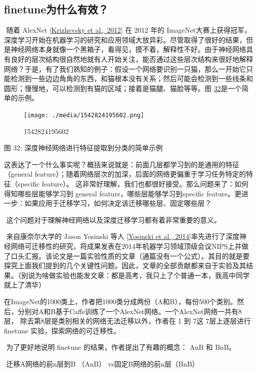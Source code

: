 \subsection{finetune为什么有效？}\label{finetuneux4e3aux4ec0ux4e48ux6709ux6548}

​ 随着 AlexNet {[}\protect\hyperlink{bookmark268}{Krizhevsky et al.,
2012}{]} 在 2012 年的
ImageNet大赛上获得冠军，深度学习开始在机器学习的研究和应用领域大放异彩。尽管取得了很好的结果，但是神经网络本身就像一个黑箱子，看得见，摸不着，解释性不好。由于神经网络具有良好的层次结构很自然地就有人开始关注，能否通过这些层次结构来很好地解释网络？于是，有了我们熟知的例子：假设一个网络要识别一只猫，那么一开始它只能检测到一些边边角角的东西，和猫根本没有关系；然后可能会检测到一些线条和圆形；慢慢地，可以检测到有猫的区域；接着是猫腿、猫脸等等。图
\protect\hyperlink{bookmark137}{32}是一个简单的示例。

\begin{figure}
\centering
\texttt{[image: ./media/1542824195602.png]}
\caption{1542824195602}
\end{figure}

图 32: 深度神经网络进行特征提取到分类的简单示例

​
这表达了一个什么事实呢？概括来说就是：前面几层都学习到的是通用的特征（general
feature）；随着网络层次的加深，后面的网络更偏重于学习任务特定的特征（specific
feature）。
这非常好理解，我们也都很好接受。那么问题来了：如何得知哪些层能够学习到
general feature，哪些层能够学习到specific
feature。更进一步：如果应用于迁移学习，如何决定该迁移哪些层、固定哪些层？

​ 这个问题对于理解神经网络以及深度迁移学习都有着非常重要的意义。

​ 来自康奈尔大学的 Jason Yosinski 等人
{[}\protect\hyperlink{bookmark318}{Yosinski et al.,
2014}{]}率先进行了深度神经网络可迁移性的研究，将成果发表在2014年机器学习领域顶级会议NIPS上并做了口头汇报。该论文是一篇实验性质的文章（通篇没有一个公式）。其目的就是要探究上面我们提到的几个关键性问题。因此，文章的全部贡献都来自于实验及其结果。（别说为啥做实验也能发文章：都是高考，我只上了个普通一本，我高中同学就上了清华）

​
在ImageNet的1000类上，作者把1000类分成两份（A和B），每份500个类别。然后，分别对A和B基于Caffe训练了一个AlexNet网络。一个AlexNet网络一共有8层，
除去第8层是类别相关的网络无法迁移以外，作者在 1 到 7这 7层上逐层进行
finetune 实验，探索网络的可迁移性。

​ 为了更好地说明 finetune 的结果，作者提出了有趣的概念： AnB 和 BnB。

​ 迁移A网络的前n层到B （AnB） vs固定B网络的前n层（BnB）

